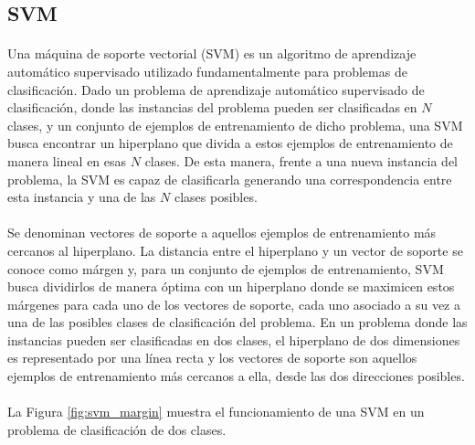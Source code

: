 \subsection{SVM} \label{capitulo:svm}

\paragraph{}Una máquina de soporte vectorial (SVM) es un algoritmo de aprendizaje automático supervisado utilizado fundamentalmente para problemas de clasificación.
Dado un problema de aprendizaje automático supervisado de clasificación, donde las instancias del problema pueden ser clasificadas en $N$ clases, y un conjunto de ejemplos de entrenamiento de dicho problema, una SVM busca encontrar un hiperplano que divida a estos ejemplos de entrenamiento de manera lineal en esas $N$ clases.
De esta manera, frente a una nueva instancia del problema, la SVM es capaz de clasificarla generando una correspondencia entre esta instancia y una de las $N$ clases posibles.

\newpage %

\paragraph{}Se denominan vectores de soporte a aquellos ejemplos de entrenamiento más cercanos al hiperplano.
La distancia entre el hiperplano y un vector de soporte se conoce como márgen y, para un conjunto de ejemplos de entrenamiento, SVM busca dividirlos de manera óptima con un hiperplano donde se maximicen estos márgenes para cada uno de los vectores de soporte, cada uno asociado a su vez a una de las posibles clases de clasificación del problema.
En un problema donde las instancias pueden ser clasificadas en dos clases, el hiperplano de dos dimensiones es representado por una línea recta y los vectores de soporte son aquellos ejemplos de entrenamiento más cercanos a ella, desde las dos direcciones posibles.

\paragraph{} La Figura \ref{fig:svm_margin} muestra el funcionamiento de una SVM en un problema de clasificación de dos clases.

